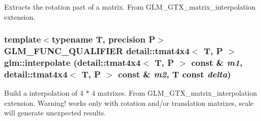 Extracts the rotation part of a matrix. From GLM\_\-GTX\_\-matrix\_\-interpolation extension. \hypertarget{group__gtx__matrix__interpolation_gc618bbef632f87be5c570aa5afe63f30}{
\subsubsection[interpolate]{\setlength{\rightskip}{0pt plus 5cm}template$<$typename T, precision P$>$ GLM\_\-FUNC\_\-QUALIFIER detail::tmat4x4$<$ T, P $>$ glm::interpolate (detail::tmat4x4$<$ T, P $>$ const \& {\em m1}, \/  detail::tmat4x4$<$ T, P $>$ const \& {\em m2}, \/  T const  {\em delta})}}
\label{group__gtx__matrix__interpolation_gc618bbef632f87be5c570aa5afe63f30}


Build a interpolation of 4 $\ast$ 4 matrixes. From GLM\_\-GTX\_\-matrix\_\-interpolation extension. Warning! works only with rotation and/or translation matrixes, scale will generate unexpected results. 
